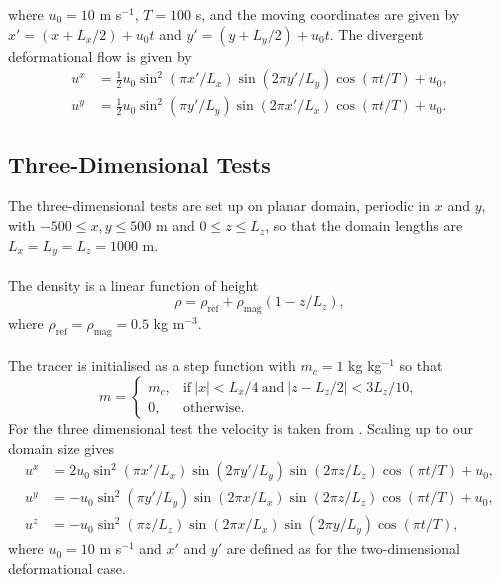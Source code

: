 \documentclass{ametsocV6.1}
\begin{document}
where $u_0=10$ m s$^{-1}$, $T=100$ s, and the moving coordinates are given by $x' = (x+L_x/2) + u_0 t$ and $y' = (y+L_y/2) + u_0 t$. The divergent deformational flow is given by
\begin{subequations}
\begin{align}
u^x & =  \tfrac{1}{2}u_0 \sin^2(\pi x'/L_x)\sin(2 \pi y'/L_y)\cos(\pi t/T)+u_0,\\ 
u^y & = \tfrac{1}{2}u_0 \sin^2(\pi y'/L_y)\sin(2 \pi x'/L_x)\cos(\pi t/T)+u_0.
\end{align}
\end{subequations}

\subsection{Three-Dimensional Tests}

The three-dimensional tests are set up on planar domain, periodic in $x$ and $y$, with $-500 \leq x,y \leq 500$ m and $0 \leq z \leq L_z$, so that the domain lengths are $L_x=L_y=L_z=1000$ m. \\
\\
The density is a linear function of height
\begin{equation}
    \rho = \rho_{\mathrm{ref}} + \rho_{\mathrm{mag}}(1-z/L_z),
\end{equation}
where $ \rho_{\mathrm{ref}}=\rho_{\mathrm{mag}} = 0.5$ kg m$^{-3}$.  \\
\\
The tracer is initialised as a step function with $m_c=1$ kg kg$^{-1}$ so that
\begin{equation}
    m = 
    \begin{cases}
        m_c, & \mathrm{if} \ |x| < L_x/4 \ \mathrm{and} \ |z-L_z/2|< 3L_z/10, \\
        0, & \mathrm{otherwise}.
    \end{cases}
\end{equation}
For the three dimensional test the velocity is taken from \cite{skamarock2006limiters}. Scaling up to our domain size gives
\begin{subequations}
\begin{align}
u^x & =  2 u_0 \sin^2(\pi x'/L_x)\sin(2 \pi y'/L_y)\sin(2 \pi z/L_z)\cos(\pi t/T)+u_0,\\ 
u^y & = -u_0 \sin^2(\pi y'/L_y)\sin(2 \pi x/L_x)\sin(2 \pi z/L_z)\cos(\pi t/T)+u_0,\\ 
u^z & = -u_0 \sin^2(\pi z/L_z)\sin(2 \pi x/L_x)\sin(2 \pi y/L_y)\cos(\pi t/T),
\end{align}
\end{subequations}
where $u_0=10$ m s$^{-1}$ and $x'$ and $y'$ are defined as for the two-dimensional deformational case.




\end{document}
